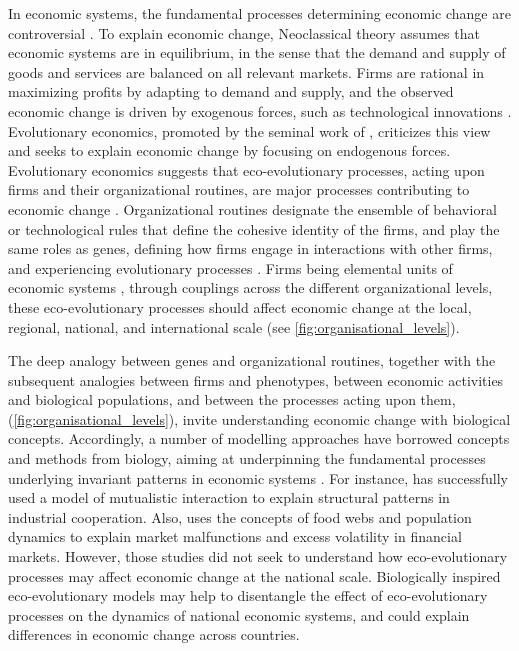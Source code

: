 In economic systems, the fundamental processes determining economic change are controversial \citep{Dopfer2007,Nelson2014,Hodgson2019}. 
%
To explain economic change, Neoclassical theory \citep{10.1093/cje/bet027} assumes that economic systems are in equilibrium, in the sense that the demand and supply of goods and services are balanced on all relevant markets. 
% 
Firms are rational in maximizing profits by adapting to demand and supply, and the observed economic change is driven by exogenous forces, such as technological innovations \citep{Romer1986}. Evolutionary economics, promoted by the seminal work of \cite{Nelson2014}, criticizes this view and seeks to explain economic change by focusing on endogenous forces. 
% 
Evolutionary economics suggests that eco-evolutionary processes, acting upon firms and their organizational routines, are major processes contributing to economic change \citep{Hodgson2019}.
% 
Organizational routines designate the ensemble of behavioral or technological rules that define the cohesive identity of the firms, and play the same roles as genes, defining how firms engage in interactions with other firms, and experiencing evolutionary processes \citep{nelson1985evolutionary}. Firms being elemental units of economic systems \cite{nelson1985evolutionary}, through couplings across the different organizational levels, these eco-evolutionary processes should affect economic change at the local, regional, national, and international scale (see \cref{fig:organisational_levels}).

The deep analogy between genes and organizational routines, together with the subsequent analogies between firms and phenotypes, between economic activities and biological populations, and between the processes acting upon them, (\cref{fig:organisational_levels}), invite understanding economic change with biological concepts.
% 
Accordingly, a number of modelling approaches have borrowed concepts and methods from biology, aiming at underpinning the fundamental processes underlying invariant patterns in economic systems \citep{Tacchella2018,Saavedra2009a,Scholl2020,Zhang2018,Modis1997,Saavedra2014,Farmer1999,Michalakelis2011,Marasco2016,Gatabazi2019,Cauwels56,Applegate2021,Suweis2015}. 
% 
For instance, \cite{Saavedra2009a} has successfully used a model of mutualistic interaction to explain structural patterns in industrial cooperation.
% 
Also, \cite{Scholl2020} uses the concepts of food webs and population dynamics to explain market malfunctions and excess volatility in financial markets.
% 
However, those studies did not seek to understand how eco-evolutionary processes may affect economic change at the national scale.
% 
Biologically inspired eco-evolutionary models may help to disentangle the effect of eco-evolutionary processes on the dynamics of national economic systems, and could explain differences in economic change across countries.

